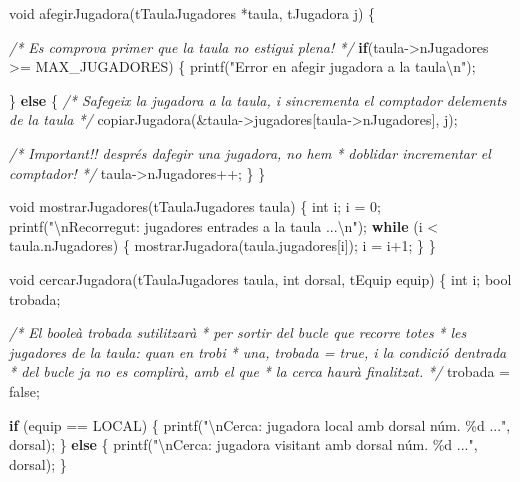 \documentclass[
]{book}
\newenvironment{Shaded}{\begin{snugshade}}{\end{snugshade}}
\newcommand{\CommentTok}[1]{\textcolor[rgb]{0.56,0.35,0.01}{\textit{#1}}}
\newcommand{\ControlFlowTok}[1]{\textcolor[rgb]{0.13,0.29,0.53}{\textbf{#1}}}
\newcommand{\DataTypeTok}[1]{\textcolor[rgb]{0.13,0.29,0.53}{#1}}
\newcommand{\DecValTok}[1]{\textcolor[rgb]{0.00,0.00,0.81}{#1}}
\newcommand{\NormalTok}[1]{#1}
\newcommand{\SpecialCharTok}[1]{\textcolor[rgb]{0.00,0.00,0.00}{#1}}
\newcommand{\StringTok}[1]{\textcolor[rgb]{0.31,0.60,0.02}{#1}}
\begin{document}
\begin{Shaded}
\begin{Highlighting}[]
\DataTypeTok{void}\NormalTok{ afegirJugadora(tTaulaJugadores *taula, tJugadora j) \{}
    
    \CommentTok{/* Es comprova primer que la taula no estigui plena! */}
    \ControlFlowTok{if}\NormalTok{(taula{-}\textgreater{}nJugadores \textgreater{}= MAX\_JUGADORES) \{}
\NormalTok{        printf(}\StringTok{"Error en afegir jugadora a la taula}\SpecialCharTok{\textbackslash{}n}\StringTok{"}\NormalTok{);}
        
\NormalTok{    \} }\ControlFlowTok{else}\NormalTok{ \{}
        \CommentTok{/* S\textquotesingle{}afegeix la jugadora a la taula, i s\textquotesingle{}incrementa}
\CommentTok{           el comptador d\textquotesingle{}elements de la taula */}
\NormalTok{        copiarJugadora(\&taula{-}\textgreater{}jugadores[taula{-}\textgreater{}nJugadores], j);}
        
        \CommentTok{/* Important!! després d\textquotesingle{}afegir una jugadora, no hem}
\CommentTok{         * d\textquotesingle{}oblidar incrementar el comptador! */}
\NormalTok{        taula{-}\textgreater{}nJugadores++;}
\NormalTok{    \}}
\NormalTok{\}}

\DataTypeTok{void}\NormalTok{ mostrarJugadores(tTaulaJugadores taula) \{}
    \DataTypeTok{int}\NormalTok{ i;}
\NormalTok{    i = }\DecValTok{0}\NormalTok{;}
\NormalTok{    printf(}\StringTok{"}\SpecialCharTok{\textbackslash{}n}\StringTok{Recorregut: jugadores entrades a la taula ...}\SpecialCharTok{\textbackslash{}n}\StringTok{"}\NormalTok{);}
    \ControlFlowTok{while}\NormalTok{ (i \textless{} taula.nJugadores) \{}
\NormalTok{        mostrarJugadora(taula.jugadores[i]);}
\NormalTok{        i = i+}\DecValTok{1}\NormalTok{;}
\NormalTok{    \}}
\NormalTok{\}}

\DataTypeTok{void}\NormalTok{ cercarJugadora(tTaulaJugadores taula, }\DataTypeTok{int}\NormalTok{ dorsal, tEquip equip) \{}
    \DataTypeTok{int}\NormalTok{ i;}
    \DataTypeTok{bool}\NormalTok{ trobada;}
    
    \CommentTok{/* El booleà \textquotesingle{}trobada\textquotesingle{} s\textquotesingle{}utilitzarà}
\CommentTok{     * per sortir del bucle que recorre totes}
\CommentTok{     * les jugadores de la taula: quan en trobi}
\CommentTok{     * una, trobada = true, i la condició d\textquotesingle{}entrada}
\CommentTok{     * del bucle ja no es complirà, amb el que}
\CommentTok{     * la cerca haurà finalitzat.}
\CommentTok{     */}
\NormalTok{    trobada = false;}
    
    \ControlFlowTok{if}\NormalTok{ (equip == LOCAL) \{}
\NormalTok{        printf(}\StringTok{"}\SpecialCharTok{\textbackslash{}n}\StringTok{Cerca: jugadora local amb dorsal núm. \%d ..."}\NormalTok{, dorsal);}
\NormalTok{    \} }\ControlFlowTok{else}\NormalTok{ \{}
\NormalTok{        printf(}\StringTok{"}\SpecialCharTok{\textbackslash{}n}\StringTok{Cerca: jugadora visitant amb dorsal núm. \%d ..."}\NormalTok{, dorsal);}
\NormalTok{    \}}
    

\end{Highlighting}
\end{Shaded}
\end{document}

